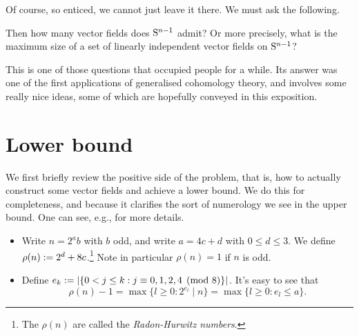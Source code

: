 Of course, so enticed, we cannot just leave it there. We must ask the
following.

\begin{question}
  \label{vfield-prob}
  Then how many vector fields does $\S^{n-1}$ admit? Or more
  precisely, what is the maximum size of a set of linearly independent
  vector fields on $\S^{n-1}$?
\end{question}

This is one of those questions that occupied people for a while. Its
answer was one of the first applications of generalised cohomology
theory, and involves some really nice ideas, some of which are
hopefully conveyed in this exposition.


\section{Lower bound}

We first briefly review the positive side of the problem, that is, how
to actually construct some vector fields and achieve a lower bound. We
do this for completeness, and because it clarifies the sort of
numerology we see in the upper bound. One can see, e.g.,
\cite{hopkins-256y, miller-vfields} for more details.

\begin{notation}
  \label{radon-hurwitz}
  \begin{itemize}[leftmargin=*]
  \item Write $n = 2^ab$ with $b$ odd, and write $a = 4c + d$ with $0
    \le d \le 3$. We define $\rho(n) \ce 2^d + 8c$.\footnote{The
      $\rho(n)$ are called the \emph{Radon-Hurwitz numbers}.} Note in
    particular $\rho(n) = 1$ if $n$ is odd.
  \item Define $e_k \ce |\{0 < j \le k : j \equiv 0,1,2,4 \pmod
    8\}|$. It's easy to see that
    \begin{equation}
      \label{radon-max}
      \rho(n) - 1 = \max \{l \ge 0 : 2^{e_l} \mid n\} = \max \{l
      \ge 0 : e_l \le a\}.
  \end{equation}
  \end{itemize}
\end{notation}

